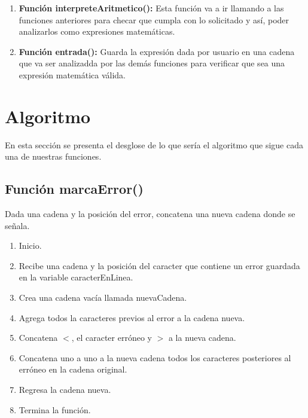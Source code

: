 \documentclass{article}
\begin{document}
\begin{enumerate}
    \item \textbf{Función interpreteAritmetico():} Esta función va a ir llamando a las funciones anteriores para checar que cumpla con lo solicitado y así, poder analizarlos como expresiones matemáticas.
    
    \item \textbf{Función entrada():} Guarda la expresión dada por usuario en una cadena que va ser analizadda por las demás funciones para verificar que sea una expresión matemática válida.
    
\end{enumerate}

\pagebreak
\section{Algoritmo}
\normalsize En esta sección se presenta el desglose de lo que sería el algoritmo que sigue cada una de nuestras funciones.
\subsection{Función marcaError()}
\normalsize Dada una cadena y la posición del error, concatena una nueva cadena donde se señala.
\begin{enumerate}
    \item Inicio.
    \item Recibe una cadena y la posición del caracter que contiene un error guardada en la variable caracterEnLinea.
    \item Crea una cadena vacía llamada nuevaCadena.
    \item Agrega todos la caracteres previos al error a la cadena nueva.
    \item Concatena $<$, el caracter erróneo y $>$ a la nueva cadena.
    \item Concatena uno a uno a la nueva cadena todos los caracteres posteriores al erróneo en la cadena original.
    \item Regresa la cadena nueva.
    \item Termina la función.
\end{enumerate}
\end{document}
